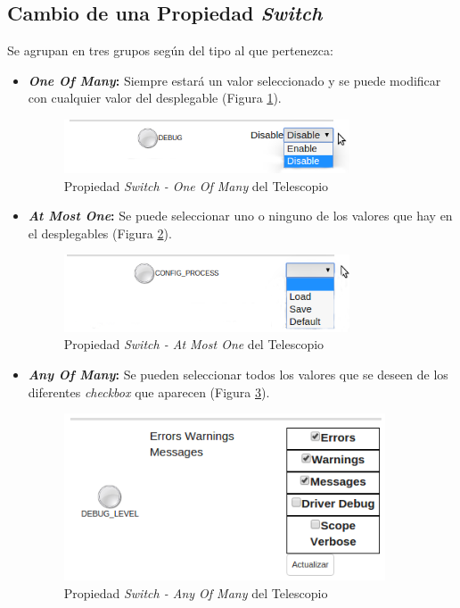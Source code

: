 \subsection{Cambio de una Propiedad \textit{Switch}}
Se agrupan en tres grupos según del tipo al que pertenezca:
\begin{itemize}
  \item \textbf{\textit{One Of Many}:} Siempre estará un valor seleccionado y se puede modificar con cualquier valor del desplegable (Figura \ref{fig:oneOfMany}).
  \begin{figure}[htb]
  \centering
  \includegraphics[width=0.8\textwidth]{./imagenes/oneOfMany}
  \caption{Propiedad \textit{Switch - One Of Many} del Telescopio} \label{fig:oneOfMany}
  \end{figure}
  \item \textbf{\textit{At Most One}:} Se puede seleccionar uno o ninguno de los valores que hay en el desplegables (Figura \ref{fig:atMostOne}).
  \begin{figure}[htb]
  \centering
  \includegraphics[width=0.8\textwidth]{./imagenes/atMostOne}
  \caption{Propiedad \textit{Switch - At Most One} del Telescopio} \label{fig:atMostOne}
  \end{figure}
  \item \textbf{\textit{Any Of Many}:} Se pueden seleccionar todos los valores que se deseen de los diferentes \textit{checkbox} que aparecen (Figura \ref{fig:anyOfMany}).
  \begin{figure}[htb]
  \centering
  \includegraphics[width=0.9\textwidth]{./imagenes/anyOfMany}
  \caption{Propiedad \textit{Switch - Any Of Many} del Telescopio} \label{fig:anyOfMany}
  \end{figure}
\end{itemize}

